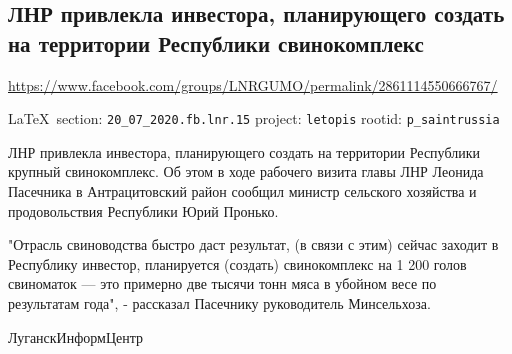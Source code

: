  
 
\subsection{ЛНР привлекла инвестора, планирующего создать на территории Республики свинокомплекс}
\url{https://www.facebook.com/groups/LNRGUMO/permalink/2861114550666767/}
  
\vspace{0.5cm}
{\small\LaTeX~section: \verb|20_07_2020.fb.lnr.15| project: \verb|letopis| rootid: \verb|p_saintrussia|}
\vspace{0.5cm}
  
ЛНР привлекла инвестора, планирующего создать на территории Республики крупный
свинокомплекс. Об этом в ходе рабочего визита главы ЛНР Леонида Пасечника в
Антрацитовский район сообщил министр сельского хозяйства и продовольствия
Республики Юрий Пронько.

"Отрасль свиноводства быстро даст результат, (в связи с этим) сейчас заходит в
Республику инвестор, планируется (создать) свинокомплекс на 1 200 голов
свиноматок --- это примерно две тысячи тонн мяса в убойном весе по результатам
года", - рассказал Пасечнику руководитель Минсельхоза.

ЛуганскИнформЦентр
